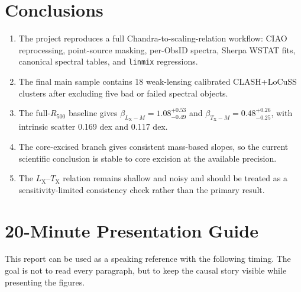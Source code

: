 \documentclass[11pt]{article}
\newcommand{\Rfive}{\ensuremath{R_{500}}}
\newcommand{\Lx}{\ensuremath{L_{\mathrm{X}}}}
\newcommand{\Tx}{\ensuremath{T_{\mathrm{X}}}}
\begin{document}
\section{Conclusions}

\begin{enumerate}
\item The project reproduces a full Chandra-to-scaling-relation workflow: CIAO reprocessing, point-source masking, per-ObsID spectra, Sherpa WSTAT fits, canonical spectral tables, and \texttt{linmix} regressions.
\item The final main sample contains 18 weak-lensing calibrated CLASH+LoCuSS clusters after excluding five bad or failed spectral objects.
\item The full-\Rfive{} baseline gives $\beta_{\Lx-M}=1.08^{+0.53}_{-0.49}$ and $\beta_{\Tx-M}=0.48^{+0.26}_{-0.25}$, with intrinsic scatter 0.169 dex and 0.117 dex.
\item The core-excised branch gives consistent mass-based slopes, so the current scientific conclusion is stable to core excision at the available precision.
\item The \Lx--\Tx{} relation remains shallow and noisy and should be treated as a sensitivity-limited consistency check rather than the primary result.
\end{enumerate}

\appendix
\section{20-Minute Presentation Guide}

This report can be used as a speaking reference with the following timing. The goal is not to read every paragraph, but to keep the causal story visible while presenting the figures.
\end{document}
